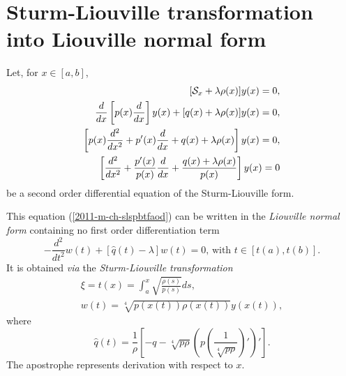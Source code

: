 \section{Sturm-Liouville transformation into Liouville normal form}
 Let, for $x\in [a,b]$,
\begin{equation}
\begin{split}
[{\cal S}_x  +\lambda \rho (x)] y(x)=0,\\
\frac{d}{dx}\left[ p(x) \frac{d}{dx}\right] y(x) + [q(x) +\lambda \rho (x)]y(x)=0,\\
\left[p(x)\frac{d^2 }{dx^2} + p'(x) \frac{d}{dx} + q(x) +\lambda \rho (x)\right] y(x)=0,\\
\left[\frac{d^2 }{dx^2} + \frac{p'(x)}{p(x)} \frac{d}{dx} + \frac{q(x) +\lambda \rho (x)}{p(x)}\right] y(x)=0
\end{split}
\label{2011-m-ch-slspbtfaod}
\end{equation}
be a second order differential equation of the
Sturm-Liouville form.\cite{birkhoff-Rota-48}

This equation (\ref{2011-m-ch-slspbtfaod}) can be written in the
{\em Liouville normal form}
 containing no first order differentiation term
\begin{equation}
-\frac{d^2}{dt^2} w(t) + [\hat{q}(t) -\lambda ] w(t)=0  \textrm{, with }t\in [ t(a)  , t(b)] .
\label{2011-m-ch-slspbtfaolnf}
\end{equation}
It is obtained {\em via} the
{\em Sturm-Liouville transformation}
\begin{equation}
\begin{split}
\xi= t(x) =   \int_a^x \sqrt{\frac{\rho(s)}{p(s)}}  ds,   \\
w(t)= \sqrt[4]{p(x(t))\rho(x(t))} y (x(t)),
\end{split}
\end{equation}
where
\begin{equation}
\hat{q}(t)= \frac{1}{\rho }\left[-q -\sqrt[4]{p\rho }
\left(p\left( \frac{1}{\sqrt[4]{p\rho }}\right)'\right)'\right].
\end{equation}
The apostrophe represents derivation with respect to $x$.

